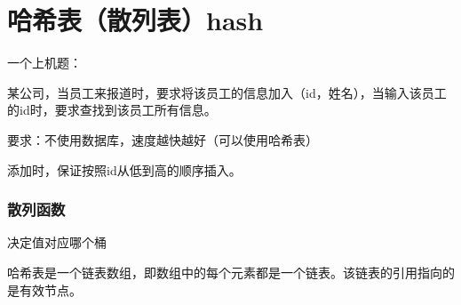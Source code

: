 \documentclass[a4paper]{report}
\begin{document}
\chapter{哈希表（散列表）hash}
一个上机题：

某公司，当员工来报道时，要求将该员工的信息加入（id，姓名），当输入该员工的id时，要求查找到该员工所有信息。

要求：不使用数据库，速度越快越好（可以使用哈希表）

添加时，保证按照id从低到高的顺序插入。
\subsection{散列函数}
决定值对应哪个桶

哈希表是一个链表数组，即数组中的每个元素都是一个链表。该链表的引用指向的是有效节点。
\end{document}
